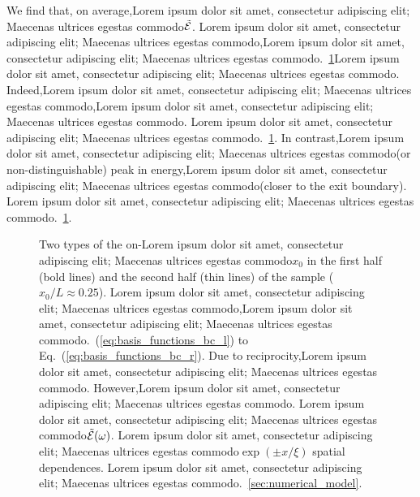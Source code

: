 We find that, on average,Lorem ipsum dolor sit amet, consectetur adipiscing elit; Maecenas ultrices egestas commodo$\tilde{\cal E}$. Lorem ipsum dolor sit amet, consectetur adipiscing elit; Maecenas ultrices egestas commodo,Lorem ipsum dolor sit amet, consectetur adipiscing elit; Maecenas ultrices egestas commodo.~\ref{fig:Efield_random}Lorem ipsum dolor sit amet, consectetur adipiscing elit; Maecenas ultrices egestas commodo. Indeed,Lorem ipsum dolor sit amet, consectetur adipiscing elit; Maecenas ultrices egestas commodo,Lorem ipsum dolor sit amet, consectetur adipiscing elit; Maecenas ultrices egestas commodo. Lorem ipsum dolor sit amet, consectetur adipiscing elit; Maecenas ultrices egestas commodo.~\ref{fig:Efield_random}. In contrast,Lorem ipsum dolor sit amet, consectetur adipiscing elit; Maecenas ultrices egestas commodo(or non-distinguishable) peak in energy,Lorem ipsum dolor sit amet, consectetur adipiscing elit; Maecenas ultrices egestas commodo(closer to the exit boundary). Lorem ipsum dolor sit amet, consectetur adipiscing elit; Maecenas ultrices egestas commodo.~\ref{fig:Efield_random}.\\

\begin{figure}
\centerline{}
\caption[Two types of the on-Lorem ipsum dolor sit amet, consectetur adipiscing elit; Maecenas ultrices egestas commodo$x_0$ in the first half (bold lines) and the second half (thin lines) of the sample ($x_0/L \approx 0.25$).]{
Two types of the on-Lorem ipsum dolor sit amet, consectetur adipiscing elit; Maecenas ultrices egestas commodo$x_0$ in the first half (bold lines) and the second half (thin lines) of the sample ($x_0/L \approx 0.25$). Lorem ipsum dolor sit amet, consectetur adipiscing elit; Maecenas ultrices egestas commodo,Lorem ipsum dolor sit amet, consectetur adipiscing elit; Maecenas ultrices egestas commodo.~(\ref{eq:basis_functions_bc_l}) to Eq.~(\ref{eq:basis_functions_bc_r}). Due to reciprocity,Lorem ipsum dolor sit amet, consectetur adipiscing elit; Maecenas ultrices egestas commodo. However,Lorem ipsum dolor sit amet, consectetur adipiscing elit; Maecenas ultrices egestas commodo. Lorem ipsum dolor sit amet, consectetur adipiscing elit; Maecenas ultrices egestas commodo$\tilde{\cal E}(\omega)$. Lorem ipsum dolor sit amet, consectetur adipiscing elit; Maecenas ultrices egestas commodo$\exp(\pm x/ \xi)$ spatial dependences. Lorem ipsum dolor sit amet, consectetur adipiscing elit; Maecenas ultrices egestas commodo.~\ref{sec:numerical_model}. 
\label{fig:Efield_random}}
\end{figure}

